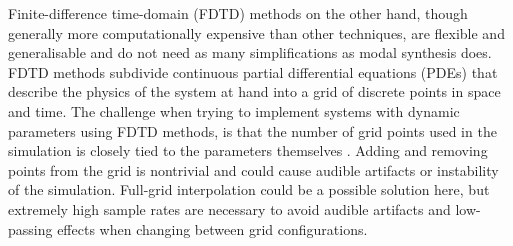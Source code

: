 Finite-difference time-domain (FDTD) methods on the other hand, though generally more computationally expensive than other techniques, are flexible and generalisable and do not need as many simplifications as modal synthesis does. %
FDTD methods subdivide continuous partial differential equations (PDEs) that describe the physics of the system at hand into a grid of discrete points in space and time.  The challenge when trying to implement systems with dynamic parameters using FDTD methods, is that the number of grid points used in the simulation is closely tied to the parameters themselves . Adding and removing points from the grid is nontrivial and could cause audible artifacts or instability of the simulation. Full-grid interpolation \cite[Ch. 5]{bilbao2009} could be a possible solution here, but extremely high sample rates are necessary to avoid audible artifacts and low-passing effects when changing between grid configurations. 

%

